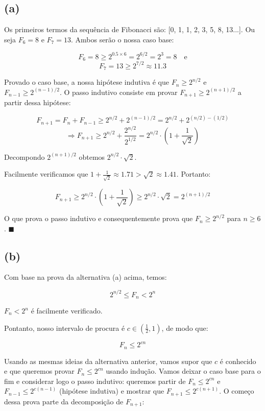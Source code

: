 \documentclass[12pt, a4paper]{article}
\begin{document}
\subsection*{(a)}

Os primeiros termos da sequência de Fibonacci são: [0, 1, 1, 2, 3, 5, 8, 13...]. Ou seja $F_6 = 8$ e $F_7 = 13$. Ambos serão o nossa caso base:

\[ F_6 = 8 \geq 2^{0.5\times6} = 2^{6/2} = 2^3 = 8 \quad \textrm{e} \]
\[ F_7 = 13 \geq 2^{7/2} \approx 11.3 \]

Provado o caso base, a nossa hipótese indutiva é que $F_n \geq 2^{n/2}$ e $F_{n-1} \geq 2^{(n-1)/2}$. O passo indutivo consiste em provar $F_{n+1} \geq 2^{(n+1)/2}$ a partir dessa hipótese:

\[ F_{n+1} = F_n + F_{n-1} \geq 2^{n/2} + 2^{(n-1)/2} = 2^{n/2} + 2^{(n/2) - (1/2)} \]
\[ \Rightarrow F_{n+1} \geq 2^{n/2} + \frac{2^{n/2}}{2^{1/2}} = 2^{n/2} \cdot \left( 1 + \frac{1}{\sqrt{2}} \right) \]

Decompondo $2^{(n+1)/2}$ obtemos $2^{n/2} \cdot \sqrt{2}$.

Facilmente verificamos que $1 + \frac{1}{\sqrt{2}} \approx 1.71 > \sqrt{2} \approx 1.41$. Portanto:

\[ F_{n+1} \geq  2^{n/2} \cdot \left( 1 + \frac{1}{\sqrt{2}} \right) \geq 2^{n/2} \cdot \sqrt{2} = 2^{(n+1)/2} \]

O que prova o passo indutivo e consequentemente prova que $F_n \geq 2^{n/2}$ para $n \geq 6$. $\blacksquare$

\subsection*{(b)}

Com base na prova da alternativa (a) acima, temos:

\[ 2^{n/2} \leq F_n < 2^n \]

$F_n < 2^n$ é facilmente verificado.

Pontanto, nosso intervalo de procura é $c \in (\frac{1}{2},1)$, de modo que:

\[ F_n \leq 2^{cn} \]

Usando as mesmas ideias da alternativa anterior, vamos supor que $c$ é conhecido e que queremos provar $F_n \leq 2^{cn}$ usando indução. Vamos deixar o caso base para o fim e considerar logo o passo indutivo: queremos partir de $F_n \leq 2^{cn}$ e $F_{n-1} \leq 2^{c(n-1)}$ (hipótese indutiva) e mostrar que $F_{n+1} \leq 2^{c(n+1)}$. O começo dessa prova parte da decomposição de $F_{n+1}$:
\end{document}
